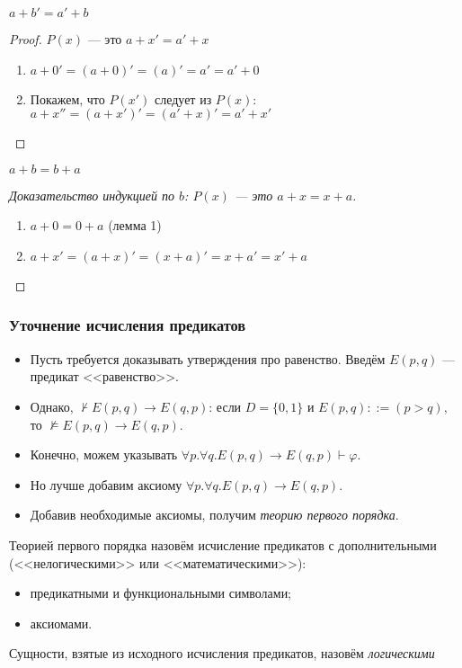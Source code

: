 \begin{lemma}[2]
$a + b' = a' + b$
\end{lemma}
\begin{proof} $P(x)$ --- это $a + x' = a' + x$
    \begin{enumerate}
\item $a + 0' = (a + 0)' = (a)' = a' = a' + 0$
\item Покажем, что $P(x')$ следует из $P(x)$: $a + x'' = (a + x')' = (a' + x)' = a' + x'$
    \end{enumerate}
\end{proof}

\begin{theorem}
    $a + b = b + a$
\end{theorem}
\begin{proof}[Доказательство индукцией по $b$: $P(x)$ --- это $a + x = x + a$]
\begin{enumerate}
\item $a + 0 = 0 + a$ (лемма 1)
\item $a + x' = (a + x)' = (x + a)' = x + a' = x' + a$
\end{enumerate}
\end{proof}

\subsubsection{Уточнение исчисления предикатов}
\begin{itemize}
\item Пусть требуется доказывать утверждения про равенство. Введём $E(p,q)$ --- предикат <<равенство>>.
\item Однако, $\not\vdash E(p,q)\to E(q,p)$: если $D = \{0,1\}$ и $E(p,q) ::= (p>q)$,
то $\not\models E(p,q)\to E(q,p)$.
\item Конечно, можем указывать $\forall p.\forall q.E(p,q)\to E(q,p) \vdash \varphi$.
\item Но лучше добавим аксиому $\forall p.\forall q.E(p,q)\to E(q,p)$.
\item Добавив необходимые аксиомы, получим \emph{теорию первого порядка}.
\end{itemize}

\begin{definition}
Теорией первого порядка назовём исчисление предикатов с дополнительными (<<нелогическими>>
или <<математическими>>):
\begin{itemize}
\item предикатными и функциональными символами;
\item аксиомами.
\end{itemize}

Сущности, взятые из исходного исчисления предикатов, назовём \emph{логическими}
\end{definition}

